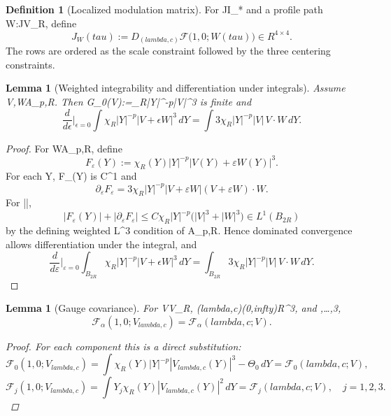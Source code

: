 \documentclass[11pt]{amsart}
\def\({}%
\def\){}%
\def\mathrm#1{#1}%
\def\mathbb#1{#1}%
\def\tau{tau}%
\def\lambda{lambda}%
\def\infty{infty}%
\theoremstyle{plain}
\newtheorem{lemma}[theorem]{Lemma}
\theoremstyle{definition}
\newtheorem{definition}[theorem]{Definition}
\theoremstyle{remark}
\newcommand{\dd}{\mathrm d}
\newcommand{\RR}{\mathbb R}
\begin{document}
\begin{definition}[Localized modulation matrix]\label{paper2:def:gauge-nondeg}
For \(J\subset I_*\) and a profile path \(W:J\to\mathcal V_R\), define
\[
J_W(\tau):=
D_{(\lambda,c)}\mathcal F\bigl(1,0;W(\tau)\bigr)
\in\mathbb R^{4\times4}.
\]
The rows are ordered as the scale constraint followed by the three centering
constraints.
\end{definition}

\begin{lemma}[Weighted integrability and differentiation under integrals]\label{paper2:lem:weighted-finite}
Assume \(V,W\in\mathcal A_{p,R}\). Then \(G_0(V):=\int\chi_R|Y|^{-p}|V|^3\)
is finite and
\[
\frac{\dd}{\dd\epsilon}\Big|_{\epsilon=0}
\int \chi_R|Y|^{-p}|V+\epsilon W|^3\,\dd Y
=\int 3\chi_R|Y|^{-p}|V|\,V\cdot W\,\dd Y.
\]
\end{lemma}
\begin{proof}
For \(W\in\mathcal A_{p,R}\), define
\[
F_\varepsilon(Y):=\chi_R(Y)|Y|^{-p}|V(Y)+\varepsilon W(Y)|^3.
\]
For each \(Y\), \(\varepsilon\mapsto F_\varepsilon(Y)\) is \(C^1\) and
\[
\partial_\varepsilon F_\varepsilon
=3\chi_R|Y|^{-p}|V+\varepsilon W|(V+\varepsilon W)\cdot W.
\]
For \(|\varepsilon|\),
\[
|F_\varepsilon(Y)|+|\partial_\varepsilon F_\varepsilon|
\le C\chi_R|Y|^{-p}\bigl(|V|^3+|W|^3\bigr)\in L^1(B_{2R})
\]
by the defining weighted \(L^3\) condition of \(\mathcal A_{p,R}\).
Hence dominated convergence allows differentiation under the integral, and
\[
\frac{\dd}{\dd\varepsilon}\Big|_{\varepsilon=0}\int_{B_{2R}}\chi_R|Y|^{-p}|V+\epsilon W|^3\,\dd Y
=\int_{B_{2R}}3\chi_R|Y|^{-p}|V|\,V\cdot W\,\dd Y.
\]
\end{proof}

\begin{lemma}[Gauge covariance]\label{paper2:lem:gauge-covariance}
For \(V\in\mathcal V_R\), \((\lambda,c)\in(0,\infty)\times\RR^3\), and
\(,\dots,3\),
\[
\mathcal F_\alpha(1,0;V_{\lambda,c})=\mathcal F_\alpha(\lambda,c;V).
\]
\begin{proof}
For each component this is a direct substitution:
\[
\mathcal F_0(1,0;V_{\lambda,c})
=\int\chi_R(Y)|Y|^{-p}|V_{\lambda,c}(Y)|^3-\Theta_0\,\dd Y
=\mathcal F_0(\lambda,c;V),
\]
\[
\mathcal F_j(1,0;V_{\lambda,c})
=\int Y_j\chi_R(Y)|V_{\lambda,c}(Y)|^2\,\dd Y
=\mathcal F_j(\lambda,c;V),\quad j=1,2,3.
\]
\end{proof}
\end{lemma}
\end{document}
